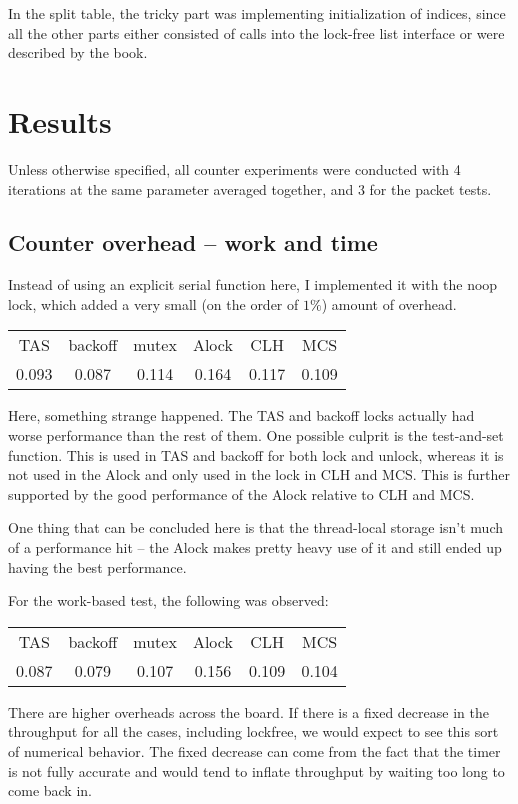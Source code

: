 \documentclass{article}
\begin{document}
In the split table, the tricky part was implementing initialization of indices, since all the other parts either consisted of calls into the lock-free list interface or were described by the book. 
\section*{Results}
Unless otherwise specified, all counter experiments were conducted with 4 iterations at the same parameter averaged together, and 3 for the packet tests.
\subsection*{Counter overhead -- work and time}
Instead of using an explicit serial function here, I implemented it with the noop lock, which added a very small (on the order of $1\%$) amount of overhead.

\begin{tabular}{c|c|c|c|c|c}
    TAS&backoff&mutex&Alock&CLH&MCS\\
    0.093& 0.087& 0.114& 0.164& 0.117& 0.109\\
\end{tabular}

Here, something strange happened. The TAS and backoff locks actually had worse performance than the rest of them. One possible culprit is the test-and-set function. This is used in TAS and backoff for both lock and unlock, whereas it is not used in the Alock and only used in the lock in CLH and MCS. This is further supported by the good performance of the Alock relative to CLH and MCS.

One thing that can be concluded here is that the thread-local storage isn't much of a performance hit -- the Alock makes pretty heavy use of it and still ended up having the best performance.

For the work-based test, the following was observed:

\begin{tabular}{c|c|c|c|c|c}
    TAS&backoff&mutex&Alock&CLH&MCS\\
    0.087& 0.079& 0.107& 0.156& 0.109& 0.104\\
\end{tabular}

There are higher overheads across the board. If there is a fixed decrease in the throughput for all the cases, including lockfree, we would expect to see this sort of numerical behavior. The fixed decrease can come from the fact that the timer is not fully accurate and would tend to inflate throughput by waiting too long to come back in.
\end{document}

